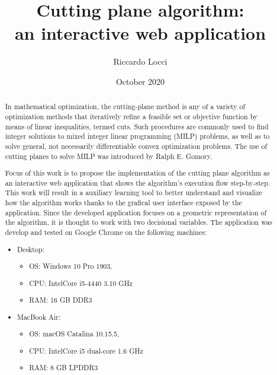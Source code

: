 \documentclass[9pt]{extarticle}
\title{Cutting plane algorithm: \\ an interactive web application}
\date{October 2020}
\author{Riccardo Locci}
\begin{document}
    \maketitle
        
    \begin{abstract} 
        In mathematical optimization, the cutting-plane method is any of a variety of optimization methods that iteratively 
        refine a feasible set or objective function by means of linear inequalities, termed cuts. 
        Such procedures are commonly used to find integer solutions to mixed integer linear programming (MILP) problems, 
        as well as to solve general, not necessarily differentiable convex optimization problems. The use of cutting planes 
        to solve MILP was introduced by Ralph E. Gomory.\cite{wiki:cuttingplane} 

        Focus of this work is to propose the implementation of the cutting plane algorithm as an interactive web application
        that shows the algorithm's execution flow step-by-step.
        This work will result in a auxiliary learning tool to better understand and visualize how the algorithm works
        thanks to the grafical user interface exposed by the application.
        Since the developed application focuses on a geometric representation of the algorithm, it is thought to work
        with two decisional variables.
        The application was develop and tested on Google Chrome on the following machines:
        
        \begin{itemize}
            \item Desktop:
            \begin{itemize} 
                \item OS: Windows 10 Pro 1903, 
                \item CPU: Intel\textregistered Core i5-4440 3.10 GHz
                \item RAM: 16 GB DDR3 
            \end{itemize}
            \item MacBook Air:
            \begin{itemize} 
                \item OS: macOS Catalina 10.15.5, 
                \item CPU: Intel\textregistered Core i5 dual-core 1.6 GHz
                \item RAM: 8 GB LPDDR3 
            \end{itemize}
        \end{itemize}
    \end{abstract}
\end{document}

